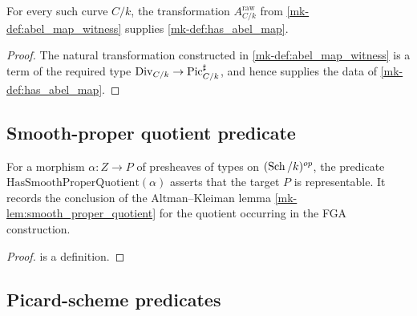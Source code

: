 \begin{definition}\label{mk-def:inst_has_abel_map}
  \leanok

  For every such curve \(C/k\), the transformation
  \(A^{\mathrm{raw}}_{C/k}\) from \ref{mk-def:abel_map_witness} supplies
  \ref{mk-def:has_abel_map}.
\end{definition}

\begin{proof}
  \leanok
{}
  The natural transformation constructed in \ref{mk-def:abel_map_witness} is a
  term of the required type
  \(\mathrm{Div}_{C/k} \to \operatorname{Pic}^\sharp_{C/k}\), and hence supplies the data of
  \ref{mk-def:has_abel_map}.
\end{proof}

\subsection{Smooth-proper quotient predicate}
\label{mk-subsec:fga_pic_quotient_carrier}

\begin{definition}\label{mk-def:has_smooth_proper_quotient}
  \leanok

  For a morphism \(\alpha : Z \to P\) of presheaves of types on
  \((\operatorname{Sch}/k)^{op}\), the predicate \(\mathrm{HasSmoothProperQuotient}(\alpha)\)
  asserts that the target \(P\) is representable. It records the conclusion
  of the Altman--Kleiman lemma \ref{mk-lem:smooth_proper_quotient} for the
  quotient occurring in the FGA construction.
\end{definition}

\begin{proof}
  \leanokThis is a definition.
\end{proof}

\subsection{Picard-scheme predicates}
\label{mk-subsec:fga_pic_scheme_carriers}

